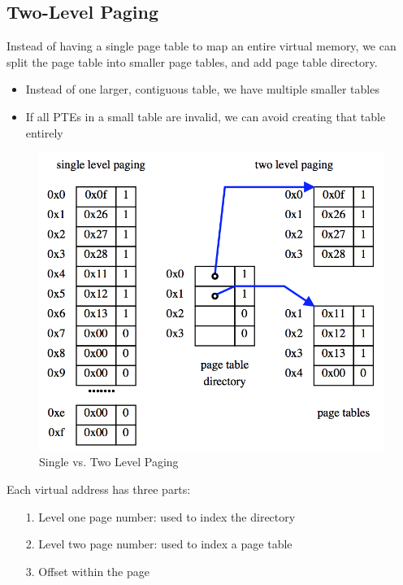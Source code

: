 \documentclass[12pt]{article}
\theoremstyle{plain}
\theoremstyle{definition}
\begin{document}
\subsection{Two-Level Paging}
Instead of having a single page table to map an entire virtual memory, we can split the page table into smaller page tables, and add page table directory.
\begin{itemize}
  \item Instead of one larger, contiguous table, we have multiple smaller tables
  \item If all PTEs in a small table are invalid, we can avoid creating that table entirely
\end{itemize}
\begin{figure}[ht]
  \centering
  \includegraphics[scale=0.7]{pictures/single_double_paging.png}
  \caption{Single vs. Two Level Paging}
  \label{fig:s_t_paging}
\end{figure}
Each virtual address has three parts:
\begin{enumerate}
  \item[1.] Level one page number: used to index the directory
  \item[2.] Level two page number: used to index a page table
  \item[3.] Offset within the page
\end{enumerate}
\end{document}
